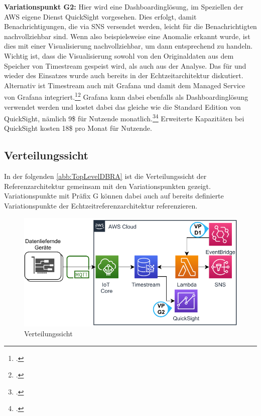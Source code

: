 \textbf{Variationspunkt G2:} Hier wird eine Dashboardinglösung, im Speziellen der \ac{AWS} eigene Dienst QuickSight vorgesehen. Dies erfolgt, damit Benachrichtigungen, die via \ac{SNS} versendet werden, leicht für die Benachrichtigten nachvollziehbar sind. Wenn also beispielsweise eine Anomalie erkannt wurde, ist dies mit einer Visualisierung nachvollziehbar, um dann entsprechend zu handeln. Wichtig ist, dass die Visualisierung sowohl von den Originaldaten aus dem Speicher von Timestream gespeist wird, als auch aus der Analyse. Das für und wieder des Einsatzes wurde auch bereits in  der Echtzeitarchitektur diskutiert. Alternativ ist Timestream auch mit Grafana und damit dem Managed Service von Grafana integriert.\footcite[Vgl.][]{AmazonWebServicesInc..o.J.bm}\nzitat\footcite[Vgl.][]{Dutt.2020} Grafana kann dabei ebenfalls als Dashboardinglösung verwendet werden und kostet dabei das gleiche wie die Standard Edition von QuickSight, nämlich 9\$ für Nutzende monatlich.\footcite[Vgl. auch im Foglenden][]{AmazonWebServicesInc..o.J.bn}\nzitat\footcite[Vgl.][]{AmazonWebServicesInc..o.J.bo} Erweiterte Kapazitäten bei QuickSight kosten 18\$ pro Monat für Nutzende. 



\subsection{Verteilungssicht}\label{subsection:Verteilungssich-B}
In der folgenden \autoref{abb:TopLevelDBRA} ist die Verteilungssicht der Referenzarchitektur gemeinsam mit den Variationspunkten gezeigt. Variationspunkte mit Präfix G können dabei auch auf bereits definierte Variationspunkte der Echtzeitreferenzarchitektur referenzieren.
\begin{figure}[H]
\centering
\includegraphics[width=\textwidth]{graphics/DB-RA-Overview.pdf}
\caption{Verteilungssicht}
\label{abb:TopLevelDBRA}
\end{figure}

